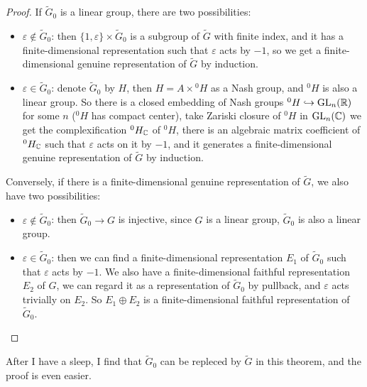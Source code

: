 \documentclass[12pt]{amsart}
\numberwithin{equation}{section}
\newcommand{\GL}{{\mathrm{GL}}} \newcommand{\SL}{{\mathrm{SL}}} \newcommand{\SU}{{\mathrm{SU}}}
\renewcommand{\tilde}{\widetilde}
\begin{document}
\begin{proof}


  If $\tilde{G}_0$ is a linear group, there are two possibilities:

  \begin{itemize}
    \item $ \varepsilon  \notin \tilde{G}_0$: then $\{ 1, \varepsilon\} \times \tilde{G}_0$ is a subgroup of $\tilde{G}$ with finite index, and it has a finite-dimensional representation such that $\varepsilon$ acts by $-1$, so we get a finite-dimensional genuine representation of $\tilde{G}$ by induction.
    \item $\varepsilon \in \tilde{G}_0$: denote $\tilde{G}_0$ by $H$, then $H = A \times {^{0}H}$ as a Nash group, and $^0H$ is also a linear group. So there is a closed embedding of Nash groups $^0H \hookrightarrow \GL_n(\BR)$ for some $n$ ($^0H$ has compact center), take Zariski closure of $^0H$ in $\GL_n(\BC)$ we get the complexification $^0H_{{\mathbb {C}}}$ of $^0H$, there is an algebraic matrix coefficient of $^0H_{{\mathbb {C}}}$ such that $\varepsilon$ acts on it by $-1$, and it generates a finite-dimensional genuine representation of $\tilde{G}$ by induction.
  \end{itemize}
  
  
  Conversely, if there is a finite-dimensional genuine representation of $\tilde{G}$, we also have two possibilities:
  \begin{itemize}
    \item $\varepsilon \notin \tilde{G}_0$: then $\tilde{G}_0 \to G$ is injective, since $G$ is a linear group, $\tilde{G}_0$ is also a linear group.
    \item $\varepsilon \in \tilde{G}_0$: then we can find a finite-dimensional representation $E_1$ of $\tilde{G}_0$ such that $\varepsilon$ acts by $-1$. We also have a finite-dimensional faithful representation $E_2$ of $G$, we can regard it as a representation of $\tilde{G}_0$ by pullback, and $\varepsilon$ acts trivially on $E_2$. So $E_1 \oplus E_2$ is a finite-dimensional faithful representation of $\tilde{G}_0$.
  \end{itemize}
\end{proof}


\begin{rk}
  After I have a sleep, I find that $\tilde{G}_0$ can be repleced by $\tilde{G}$ in this theorem, and the proof is even easier.
\end{rk}
\end{document}

